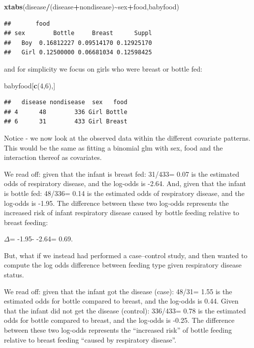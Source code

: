 \documentclass[
]{article}
\newenvironment{Shaded}{\begin{snugshade}}{\end{snugshade}}
\newcommand{\DecValTok}[1]{\textcolor[rgb]{0.00,0.00,0.81}{#1}}
\newcommand{\FunctionTok}[1]{\textcolor[rgb]{0.13,0.29,0.53}{\textbf{#1}}}
\newcommand{\NormalTok}[1]{#1}
\newcommand{\SpecialCharTok}[1]{\textcolor[rgb]{0.81,0.36,0.00}{\textbf{#1}}}
\begin{document}
\begin{Shaded}
\begin{Highlighting}[]
\FunctionTok{xtabs}\NormalTok{(disease}\SpecialCharTok{/}\NormalTok{(disease}\SpecialCharTok{+}\NormalTok{nondisease)}\SpecialCharTok{\textasciitilde{}}\NormalTok{sex}\SpecialCharTok{+}\NormalTok{food,babyfood)}
\end{Highlighting}
\end{Shaded}

\begin{verbatim}
##       food
## sex        Bottle     Breast      Suppl
##   Boy  0.16812227 0.09514170 0.12925170
##   Girl 0.12500000 0.06681034 0.12598425
\end{verbatim}

and for simplicity we focus on girls who were breast or bottle fed:

\begin{Shaded}
\begin{Highlighting}[]
\NormalTok{babyfood[}\FunctionTok{c}\NormalTok{(}\DecValTok{4}\NormalTok{,}\DecValTok{6}\NormalTok{),]}
\end{Highlighting}
\end{Shaded}

\begin{verbatim}
##   disease nondisease  sex   food
## 4      48        336 Girl Bottle
## 6      31        433 Girl Breast
\end{verbatim}

Notice - we now look at the observed data within the different covariate
patterns. This would be the same as fitting a binomial glm with sex,
food and the interaction thereof as covariates.

We read off: given that the infant is breast fed: 31/433= 0.07 is the
estimated odds of respiratory disease, and the log-odds is -2.64. And,
given that the infant is bottle fed: 48/336= 0.14 is the estimated odds
of respiratory disease, and the log-odds is -1.95. The difference
between these two log-odds represents the increased risk of infant
respiratory disease caused by bottle feeding relative to breast feeding:

\(\Delta\)= -1.95- -2.64= 0.69.

But, what if we instead had performed a case--control study, and then
wanted to compute the log odds difference between feeding type given
respiratory disease status.

We read off: given that the infant got the disease (case): 48/31= 1.55
is the estimated odds for bottle compared to breast, and the log-odds is
0.44. Given that the infant did not get the disease (control): 336/433=
0.78 is the estimated odds for bottle compared to breast, and the
log-odds is -0.25. The difference between these two log-odds represents
the ``increased risk'' of bottle feeding relative to breast feeding
``caused by respiratory disease''.
\end{document}
